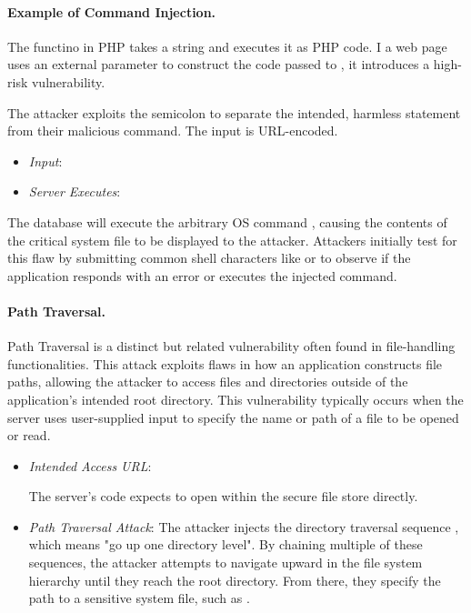 \paragraph{Example of Command Injection.} The  functino in PHP takes a string and executes it as PHP code. I a web page uses an external parameter to construct the code passed to , it introduces a high-risk vulnerability.


The attacker exploits the semicolon to separate the intended, harmless statement from their malicious command. The input is URL-encoded.

\begin{itemize}
    \item \textit{Input}: 
    \item \textit{Server Executes}: 
\end{itemize}

The database will execute the arbitrary OS command , causing the contents of the critical system file to be displayed to the attacker. Attackers initially test for this flaw by submitting common shell characters like \NewTexttt{;} or \NewTexttt{\&} to observe if the application responds with an error or executes the injected command.

\paragraph{Path Traversal.} Path Traversal is a distinct but related vulnerability often found in file-handling functionalities. This attack exploits flaws in how an application constructs file paths, allowing the attacker to access files and directories outside of the application's intended root directory. This vulnerability typically occurs when the server uses user-supplied input to specify the name or path of a file to be opened or read.

\begin{itemize}
    \item \textit{Intended Access URL}: 

          The server's code expects to open  within the secure file store directly.
    \item \textit{Path Traversal Attack}: The attacker injects the directory traversal sequence , which means "go up one directory level". By chaining multiple of these sequences, the attacker attempts to navigate upward in the file system hierarchy until they reach the root directory. From there, they specify the path to a sensitive system file, such as .
\end{itemize}

